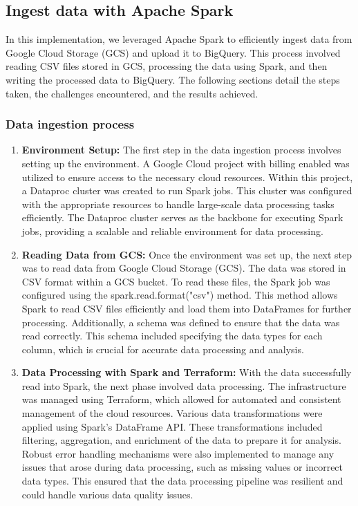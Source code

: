 \subsection{Ingest data with Apache Spark}
In this implementation, we leveraged Apache Spark to efficiently ingest data from Google Cloud
Storage (GCS) and upload it to BigQuery. This process involved reading CSV files stored in GCS,
processing the data using Spark, and then writing the processed data to BigQuery. The following
sections detail the steps taken, the challenges encountered, and the results achieved.

\subsubsection{Data ingestion process}
\begin{enumerate}
    \item \textbf{Environment Setup:} The first step in the data ingestion process involves setting
        up the environment. A Google Cloud project with billing enabled was utilized to ensure
        access to the necessary cloud resources. Within this project, a Dataproc cluster was created
        to run Spark jobs. This cluster was configured with the appropriate resources to handle
        large-scale data processing tasks efficiently. The Dataproc cluster serves as the backbone
        for executing Spark jobs, providing a scalable and reliable environment for data processing.

    \item \textbf{Reading Data from GCS:} Once the environment was set up, the next step was to read
        data from Google Cloud Storage (GCS). The data was stored in CSV format within a GCS bucket.
        To read these files, the Spark job was configured using the spark.read.format("csv") method.
        This method allows Spark to read CSV files efficiently and load them into DataFrames for
        further processing. Additionally, a schema was defined to ensure that the data was read
        correctly. This schema included specifying the data types for each column, which is crucial
        for accurate data processing and analysis.

    \item \textbf{Data Processing with Spark and Terraform:} With the data successfully read into
        Spark, the next phase involved data processing. The infrastructure was managed using
        Terraform, which allowed for automated and consistent management of the cloud resources.
        Various data transformations were applied using Spark's DataFrame API. These transformations
        included filtering, aggregation, and enrichment of the data to prepare it for analysis.
        Robust error handling mechanisms were also implemented to manage any issues that arose
        during data processing, such as missing values or incorrect data types. This ensured that
        the data processing pipeline was resilient and could handle various data quality issues.


\end{enumerate}
